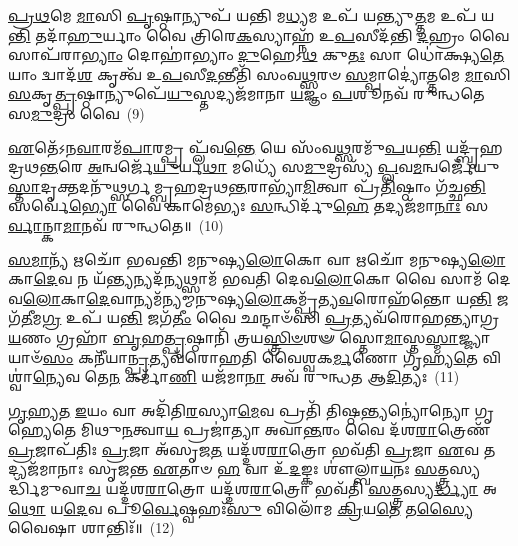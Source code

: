 {\anuvakamend[{\-\ul{𑌤𑌿}\-\-\ul{𑌷𑍍𑌠𑌾}\-𑌮𑍇\-\ul{𑌤𑌿} 𑌤𑌾\-\ul{𑌸𑌾}\-𑌨𑍍𑌤\-\ul{𑌸𑍍𑌮𑌾}\-𑌦𑍍𑌦𑍍𑌵𑍇 𑌚᳴}]}%

\-\ul{𑌪𑍍𑌰}\-\-\ul{𑌥}\-𑌮𑍇 \ul{𑌮𑌾}\-𑌸𑌿 \ul{𑌪𑍃}\-𑌷𑍍𑌠𑌾𑌨𑍍𑌯𑍁𑌪᳴ 𑌯𑌨𑍍𑌤𑌿 𑌮\-\ul{𑌧𑍍𑌯}\-𑌮 𑌉𑌪᳴ 𑌯𑌨𑍍𑌤𑍍𑌯𑍁\-\ul{𑌤𑍍𑌤}\-𑌮 𑌉𑌪᳴ 𑌯\-\ul{𑌨𑍍𑌤𑌿} 𑌤𑌦𑌾᳴\-\ul{𑌹𑍁}\-𑌰𑍍𑌯𑌾𑌂 𑌵𑍈 𑌤𑍍𑌰𑌿𑌰𑍇\-\ul{𑌕}\-𑌸𑍍𑌯𑌾𑌹𑍍𑌨᳴ 𑌉\-\ul{𑌪}\-𑌸𑍀𑌦᳴𑌨𑍍𑌤𑌿 \ul{𑌦}\-𑌹𑍍𑌰𑌂 𑌵𑍈 𑌸𑌾𑌪᳴𑌰𑌾\-\ul{𑌭𑍍𑌯𑌾𑌂} 𑌦𑍋𑌹𑌾॑𑌭𑍍𑌯𑌾𑌂 \ul{𑌦𑍁}\-𑌹𑍇\-𑌽\-\ul{𑌥} 𑌕𑍁\-\ul{𑌤𑌃} 𑌸𑌾 𑌧𑍋॑𑌕𑍍𑌷𑍍𑌯\-\ul{𑌤𑍇} 𑌯𑌾𑌂 𑌦𑍍𑌵𑌾𑌦᳴\-\ul{𑌶} 𑌕𑍃𑌤𑍍𑌵᳴ 𑌉\-\ul{𑌪}\-𑌸𑍀\-\ul{𑌦}\-𑌨𑍍𑌤𑍀𑌤𑌿᳴ 𑌸𑌂𑌵\-\ul{𑌥𑍍𑌸}\-𑌰𑍞 \ul{𑌸}\-𑌮𑍍𑌪𑌾𑌦𑍍𑌯𑍋॑\-\ul{𑌤𑍍𑌤}\-𑌮𑍇 \ul{𑌮𑌾}\-𑌸𑌿 \ul{𑌸}\-𑌕𑍃\-\ul{𑌤𑍍𑌪𑍃}\-𑌷𑍍𑌠𑌾𑌨𑍍𑌯𑍁𑌪𑍇᳴\-\ul{𑌯𑍁}\-𑌸𑍍𑌤𑌦𑍍𑌯𑌜᳴𑌮𑌾𑌨𑌾 \ul{𑌯}\-𑌜𑍍𑌞𑌂 \ul{𑌪}\-𑌶𑍂𑌨𑌵᳴ 𑌰𑍁𑌨𑍍𑌧𑌤𑍇 𑌸\-\ul{𑌮𑍁}\-𑌦𑍍𑌰𑌂 𑌵𑍈~(9)

\-\ul{𑌏}\-𑌤𑍇᳴\-𑌽𑌨\-\ul{𑌵𑌾}\-𑌰𑌮᳴\-\ul{𑌪𑌾}\-𑌰𑌮𑍍𑌪𑍍𑌰 𑌪𑍍𑌲᳴𑌵\-\ul{𑌨𑍍𑌤𑍇} 𑌯𑍇 𑌸𑌂᳴𑌵\-\ul{𑌥𑍍𑌸}\-𑌰𑌮𑍁᳴\-\ul{𑌪}\-𑌯\-\ul{𑌨𑍍𑌤𑌿} 𑌯𑌦𑍍𑌬𑍃᳴𑌹𑌦𑍍𑌰𑌥\-\ul{𑌨𑍍𑌤}\-𑌰𑍇 \ul{𑌅}\-𑌨𑍍𑌵𑌰𑍍𑌜𑍇᳴\-\ul{𑌯𑍁}\-𑌰𑍍𑌯\-\ul{𑌥𑌾} 𑌮𑌧𑍍𑌯𑍇᳴ 𑌸\-\ul{𑌮𑍁}\-𑌦𑍍𑌰𑌸𑍍𑌯᳴ \ul{𑌪𑍍𑌲}\-𑌵\-\ul{𑌮}\-𑌨𑍍𑌵𑌰𑍍𑌜𑍇᳴𑌯𑍁\-\ul{𑌸𑍍𑌤𑌾}\-𑌦𑍃𑌕𑍍𑌤\-𑌦𑌨𑍁᳴𑌥𑍍𑌸𑌰𑍍𑌗𑌮𑍍𑌬𑍃𑌹𑌦𑍍𑌰𑌥\-\ul{𑌨𑍍𑌤}\-𑌰𑌾𑌭𑍍𑌯𑌾᳴\-\ul{𑌮𑌿}\-𑌤𑍍𑌵𑌾 𑌪𑍍𑌰᳴\-\ul{𑌤𑌿}\-𑌷𑍍𑌠𑌾𑌂 𑌗᳴𑌚𑍍𑌛\-\ul{𑌨𑍍𑌤𑌿} 𑌸𑌰𑍍𑌵𑍇॑\-\ul{𑌭𑍍𑌯𑍋} 𑌵𑍈 𑌕𑌾𑌮𑍇॑𑌭𑍍𑌯𑌃 \ul{𑌸}\-𑌨𑍍𑌧𑌿𑌰𑍍𑌦𑍁᳴\-\ul{𑌹𑍇} 𑌤𑌦𑍍𑌯𑌜᳴𑌮𑌾\-\ul{𑌨𑌾𑌃} 𑌸\-\ul{𑌰𑍍𑌵𑌾}\-𑌨𑍍𑌕𑌾\-\ul{𑌮𑌾}\-𑌨𑌵᳴ 𑌰𑍁𑌨𑍍𑌧𑌤𑍇॥~(10)

{\anuvakamend[{\-\ul{𑌸}\-\-\ul{𑌮𑍁}\-𑌦𑍍𑌰𑌂 𑌵𑍈 𑌚𑌤𑍁᳴𑌸𑍍𑌤𑍍𑌰𑌿𑍞𑌶𑌚𑍍𑌚}]}%

\-\ul{𑌸}\-\-\ul{𑌮𑌾}\-𑌨𑍍𑌯᳴ 𑌋𑌚𑍋᳴ 𑌭𑌵𑌨𑍍𑌤𑌿 𑌮𑌨𑍁𑌷𑍍𑌯\-\ul{𑌲𑍋}\-𑌕𑍋 𑌵𑌾 𑌋𑌚𑍋᳴ 𑌮𑌨𑍁𑌷𑍍𑌯\-\ul{𑌲𑍋}\-𑌕𑌾\-\ul{𑌦𑍇}\-𑌵 𑌨 𑌯᳴\-\ul{𑌨𑍍𑌤𑍍𑌯}\-𑌨𑍍𑌯𑌦᳴\-\ul{𑌨𑍍𑌯}\-𑌥𑍍𑌸𑌾𑌮᳴ 𑌭𑌵𑌤𑌿 𑌦𑍇𑌵\-\ul{𑌲𑍋}\-𑌕𑍋 𑌵𑍈 𑌸𑌾𑌮᳴ 𑌦𑍇𑌵\-\ul{𑌲𑍋}\-𑌕𑌾\-\ul{𑌦𑍇}\-𑌵𑌾𑌨𑍍𑌯𑌮᳴𑌨𑍍𑌯𑌮𑍍𑌮𑌨𑍁𑌷𑍍𑌯\-\ul{𑌲𑍋}\-𑌕𑌮𑍍𑌪𑍍𑌰᳴𑌤𑍍𑌯\-\ul{𑌵}\-𑌰𑍋𑌹᳴𑌨𑍍𑌤𑍋 𑌯\-\ul{𑌨𑍍𑌤𑌿} 𑌜𑌗᳴\-\ul{𑌤𑍀}\-𑌮\-\ul{𑌗𑍍𑌰} 𑌉𑌪᳴ 𑌯\-\ul{𑌨𑍍𑌤𑌿} 𑌜𑌗᳴\-\ul{𑌤𑍀𑌂} 𑌵𑍈 𑌛𑌨𑍍𑌦𑌾𑍞᳴𑌸𑌿 \ul{𑌪𑍍𑌰}\-𑌤𑍍𑌯𑌵᳴𑌰𑍋𑌹𑌨𑍍𑌤𑍍𑌯𑌾𑌗𑍍𑌰\-\ul{𑌯}\-𑌣𑌂 𑌗𑍍𑌰𑌹𑌾᳴ \ul{𑌬𑍃}\-𑌹\-\ul{𑌤𑍍𑌪𑍃}\-𑌷𑍍𑌠𑌾𑌨𑌿᳴ 𑌤𑍍𑌰𑌯\-\ul{𑌸𑍍𑌤𑍍𑌰𑌿}\-\-\ul{𑍞}\-𑌶𑍟 𑌸𑍍𑌤𑍋\-\ul{𑌮𑌾}\-𑌸𑍍𑌤\-\ul{𑌸𑍍𑌮𑌾}\-𑌜𑍍𑌜𑍍𑌯𑌾𑌯𑌾𑍞᳴\-\ul{𑌸𑌂} 𑌕𑌨𑍀᳴𑌯𑌾\-\ul{𑌨𑍍𑌪𑍍𑌰}\-𑌤𑍍𑌯𑌵᳴𑌰𑍋𑌹𑌤𑌿 𑌵𑍈𑌶𑍍𑌵𑌕\-\ul{𑌰𑍍𑌮}\-𑌣𑍋 𑌗𑍃᳴𑌹𑍍𑌯\-\ul{𑌤𑍇} 𑌵𑌿𑌶𑍍𑌵𑌾॑\-\ul{𑌨𑍍𑌯𑍇}\-𑌵 𑌤𑍇\-\ul{𑌨} 𑌕𑌰𑍍𑌮𑌾᳴\-\ul{𑌣𑌿} 𑌯𑌜᳴𑌮𑌾\-\ul{𑌨𑌾} 𑌅𑌵᳴ 𑌰𑍁𑌨𑍍𑌧𑌤 𑌆\-\ul{𑌦𑌿}\-𑌤𑍍𑌯𑌃~(11)

\-\ul{𑌗𑍃}\-\-\ul{𑌹𑍍𑌯}\-\-\ul{𑌤} \ul{𑌇}\-𑌯𑌂 𑌵𑌾 𑌅𑌦𑌿᳴𑌤𑌿\-\ul{𑌰}\-𑌸𑍍𑌯𑌾\-\ul{𑌮𑍇}\-𑌵 𑌪𑍍𑌰𑌤𑌿᳴ 𑌤𑌿𑌷𑍍𑌠\-\ul{𑌨𑍍𑌤𑍍𑌯}\-𑌨𑍍𑌯𑍋॑𑌨𑍍𑌯𑍋 𑌗𑍃𑌹𑍍𑌯𑍇𑌤𑍇 𑌮𑌿𑌥𑍁\-\ul{𑌨}\-𑌤𑍍𑌵𑌾\-\ul{𑌯} 𑌪𑍍𑌰𑌜𑌾॑𑌤𑍍𑌯𑌾 𑌅𑌵𑌾\-\ul{𑌨𑍍𑌤}\-𑌰𑌂 𑌵𑍈 𑌦᳴𑌶\-\ul{𑌰𑌾}\-𑌤𑍍𑌰𑍇𑌣᳴ \ul{𑌪𑍍𑌰}\-𑌜𑌾𑌪᳴𑌤𑌿𑌃 \ul{𑌪𑍍𑌰}\-𑌜𑌾 𑌅᳴𑌸𑍃𑌜\-\ul{𑌤} 𑌯𑌦𑍍𑌦᳴𑌶\-\ul{𑌰𑌾}\-𑌤𑍍𑌰𑍋 𑌭𑌵᳴𑌤𑌿 \ul{𑌪𑍍𑌰}\-𑌜𑌾 \ul{𑌏}\-𑌵 𑌤𑌦𑍍𑌯𑌜᳴𑌮𑌾𑌨𑌾𑌃 𑌸𑍃𑌜𑌨𑍍𑌤 \ul{𑌏}\-𑌤𑌾𑍞 \ul{𑌹} 𑌵𑌾 𑌉᳴\-\ul{𑌦}\-𑌙𑍍𑌕𑌃 𑌶𑍗॑𑌲𑍍𑌬𑌾\-\ul{𑌯}\-𑌨𑌃 \ul{𑌸}\-𑌤𑍍𑌤𑍍𑌰𑌸𑍍𑌯𑌰𑍍𑌦𑍍𑌧𑌿᳴𑌮𑍁𑌵𑌾\-\ul{𑌚} 𑌯𑌦𑍍𑌦᳴𑌶\-\ul{𑌰𑌾}\-𑌤𑍍𑌰𑍋 𑌯𑌦𑍍𑌦᳴𑌶\-\ul{𑌰𑌾}\-𑌤𑍍𑌰𑍋 𑌭𑌵᳴𑌤𑌿 \ul{𑌸}\-𑌤𑍍𑌤𑍍𑌰𑌸𑍍𑌯\-\ul{𑌰𑍍𑌦𑍍𑌧𑍍𑌯𑌾} 𑌅\-\ul{𑌥𑍋} 𑌯\-\ul{𑌦𑍇}\-𑌵 𑌪𑍂\-\ul{𑌰𑍍𑌵𑍇}\-𑌷𑍍𑌵𑌹𑌃᳴\-\ul{𑌸𑍁} 𑌵𑌿𑌲𑍋᳴𑌮 \ul{𑌕𑍍𑌰𑌿}\-𑌯\-\ul{𑌤𑍇} 𑌤\-\ul{𑌸𑍍𑌯𑍈}\-𑌵𑍈𑌷𑌾 𑌶𑌾𑌨𑍍𑌤𑌿𑌃᳴॥~(12)

